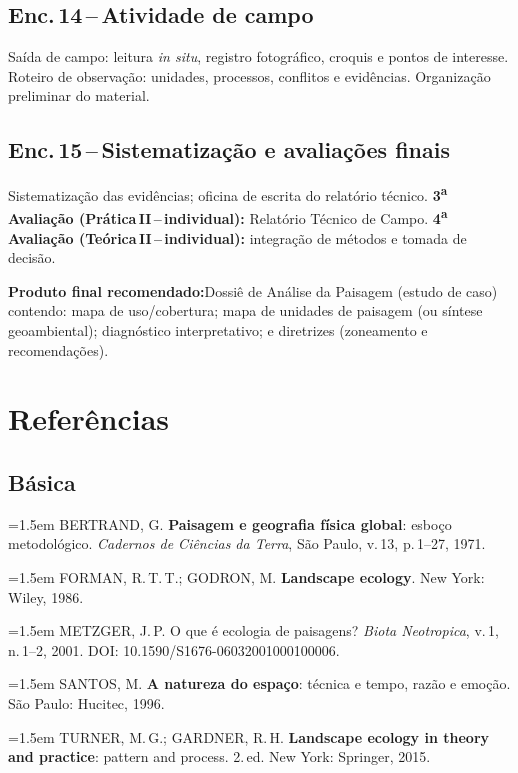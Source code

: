 \documentclass[11pt,a4paper]{article}
\begin{document}
\subsection*{Enc.\,14\,--\,Atividade de campo}
Saída de campo: leitura \textit{in situ}, registro fotográfico, croquis e pontos de interesse. Roteiro de observação: unidades, processos, conflitos e evidências. Organização preliminar do material.

\subsection*{Enc.\,15\,--\,Sistematização e avaliações finais}
Sistematização das evidências; oficina de escrita do relatório técnico. \textbf{3\textsuperscript{a}\,Avaliação (Prática\,II\,--\,individual):} Relatório Técnico de Campo. \textbf{4\textsuperscript{a}\,Avaliação (Teórica\,II\,--\,individual):} integração de métodos e tomada de decisão.

\vspace{6pt}
\begin{tcolorbox}[uefsbox]
\textbf{Produto final recomendado:}\enspace Dossiê de Análise da Paisagem (estudo de caso) contendo: mapa de uso/cobertura; mapa de unidades de paisagem (ou síntese geoambiental); diagnóstico interpretativo; e diretrizes (zoneamento e recomendações).
\end{tcolorbox}

\section*{Referências}

\subsection*{Básica}

\begin{small}
\hangindent=1.5em
BERTRAND, G. \textbf{Paisagem e geografia física global}: esboço metodológico. \textit{Cadernos de Ciências da Terra}, São Paulo, v.\,13, p.\,1--27, 1971.\par\medskip

\hangindent=1.5em
FORMAN, R.\,T.\,T.; GODRON, M. \textbf{Landscape ecology}. New York: Wiley, 1986.\par\medskip

\hangindent=1.5em
METZGER, J.\,P. O que é ecologia de paisagens? \textit{Biota Neotropica}, v.\,1, n.\,1--2, 2001. DOI: 10.1590/S1676-06032001000100006.\par\medskip

\hangindent=1.5em
SANTOS, M. \textbf{A natureza do espaço}: técnica e tempo, razão e emoção. São Paulo: Hucitec, 1996.\par\medskip

\hangindent=1.5em
TURNER, M.\,G.; GARDNER, R.\,H. \textbf{Landscape ecology in theory and practice}: pattern and process. 2.\,ed. New York: Springer, 2015.
\end{small}
\end{document}
